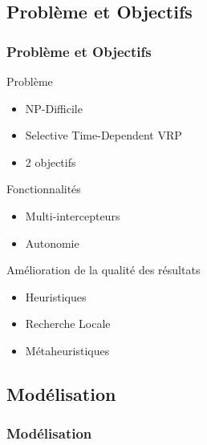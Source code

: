 \subsection{Problème et Objectifs}
\begin{frame}
	\frametitle{Problème et Objectifs}
	\begin{block}{Problème}
		\begin{itemize}
			\item NP-Difficile
			\item Selective Time-Dependent VRP
			\item 2 objectifs
		\end{itemize}
	\end{block}
	\begin{exampleblock}{Fonctionnalités}
		\begin{itemize}
			\item Multi-intercepteurs
			\item Autonomie
		\end{itemize}
	\end{exampleblock}
	\begin{exampleblock}{Amélioration de la qualité des résultats}
		\begin{itemize}
			\item Heuristiques
			\item Recherche Locale
			\item Métaheuristiques
		\end{itemize}
	\end{exampleblock}
\end{frame}

\subsection{Modélisation}
\begin{frame}
	\frametitle{Modélisation}
	\begin{center}
		
	\end{center}
\end{frame}

